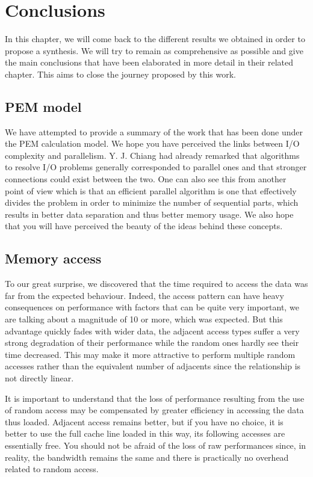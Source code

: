 
\chapter{Conclusions}

In this chapter, we will come back to the different results we obtained in order to propose a synthesis. We will try to remain as comprehensive as possible and give the main conclusions that have been elaborated in more detail in their related chapter. This aims to close the journey proposed by this work.

\section{PEM model}

We have attempted to provide a summary of the work that has been done under the PEM calculation model. We hope you have perceived the links between I/O complexity and parallelism. Y. J. Chiang had already remarked that algorithms to resolve I/O problems generally corresponded to parallel ones and that stronger connections could exist between the two. One can also see this from another point of view which is that an efficient parallel algorithm is one that effectively divides the problem in order to minimize the number of sequential parts, which results in better data separation and thus better memory usage. We also hope that you will have perceived the beauty of the ideas behind these concepts.

\section{Memory access}

To our great surprise, we discovered that the time required to access the data was far from the expected behaviour. Indeed, the access pattern can have heavy consequences on performance with factors that can be quite very important, we are talking about a magnitude of 10 or more, which was expected. But this advantage quickly fades with wider data, the adjacent access types suffer a very strong degradation of their performance while the random ones hardly see their time decreased. This may make it more attractive to perform multiple random accesses rather than the equivalent number of adjacents since the relationship is not directly linear.

It is important to understand that the loss of performance resulting from the use of random access may be compensated by greater efficiency in accessing the data thus loaded. Adjacent access remains better, but if you have no choice, it is better to use the full cache line loaded in this way, its following accesses are essentially free. You should not be afraid of the loss of raw performances since, in reality, the bandwidth remains the same and there is practically no overhead related to random access.

